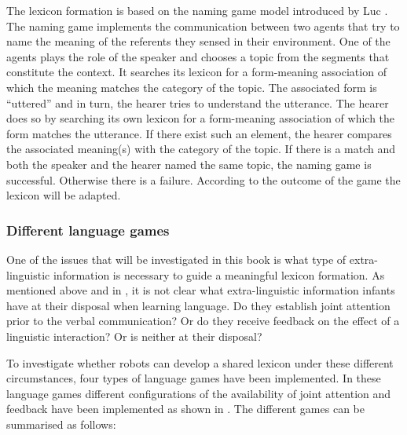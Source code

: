 The lexicon formation is based on the naming game model introduced by Luc \citet{steels:1996a}. The naming game implements the communication between two agents that try to name the meaning of the referents they sensed in their environment. One of the agents plays the role of the speaker and chooses a topic from the segments that constitute the context. It searches its lexicon for a form-meaning association of which the meaning matches the category of the topic. The associated form is ``uttered'' and in turn, the hearer tries to understand the utterance. The hearer does so by searching its own lexicon for a form-meaning association of which the form matches the utterance. If there exist such an element, the hearer compares the associated meaning(s) with the category of the topic. If there is a match and both the speaker and the hearer named the same topic, the naming game is successful. Otherwise there is a failure. According to the outcome of the game the lexicon will be adapted. 

\subsubsection{Different language games}

One of the issues that will be investigated in this book is what type of extra-linguistic information is necessary to guide a meaningful lexicon formation. As mentioned above and in , it is not clear what extra-linguistic information infants have at their disposal when learning language. Do they establish joint attention prior to the verbal communication? Or do they receive feedback on the effect of a linguistic interaction? Or is neither at their disposal? 

\enlargethispage{1\baselineskip}
To investigate whether robots can develop a shared lexicon under these different circumstances, four types of language games have been implemented. In these language games different configurations of the availability of joint attention and feedback have been implemented as shown in . The different games can be summarised as follows:

